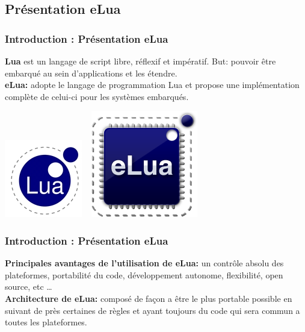 \documentclass{beamer}
\begin{document}
\subsection{Présentation eLua}
\begin{frame}
\frametitle{Introduction : Présentation eLua}

\textbf{Lua} est un langage de script libre, réflexif et impératif. But: pouvoir être embarqué au sein d'applications et les étendre. \\
\vspace{0.5cm}
\textbf{eLua:} adopte le langage de programmation Lua et propose une implémentation complète de celui-ci pour les systèmes embarqués. \\

\begin{center}
 \includegraphics[scale=0.55]{../images/eLua/Lua.JPG} \ \quad
 \includegraphics[scale=0.3]{../images/eLua/logo_eLua.png}
\end{center}
\end{frame}

\begin{frame}
\frametitle{Introduction : Présentation eLua}

\textbf{Principales avantages de l'utilisation de eLua: } un contrôle absolu des plateformes, portabilité du code, développement autonome, flexibilité,
open source, etc \ldots \\
\vspace{0.5cm}
\textbf{Architecture de eLua:} composé de façon a être le plus portable possible en suivant de près certaines de règles et ayant toujours du code qui sera
commun a toutes les plateformes.

\end{frame}
\end{document}
